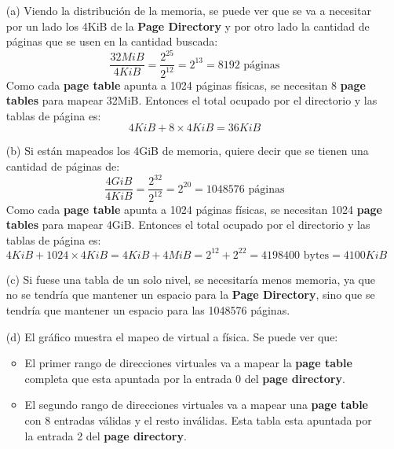 \documentclass[12pt]{article}
\begin{document}
\newpage
\begin{rta}
    \begin{itemize}
        \item[(a)] Viendo la distribución de la memoria, se puede ver que se va a necesitar por un lado los 4KiB de la \textbf{Page Directory} y por otro lado la cantidad de páginas que se usen en la cantidad buscada:
        \begin{equation*}
            \frac{32MiB}{4KiB} = \frac{2^{25}}{2^{12}} = 2^{13} = 8192 \text{ páginas}
        \end{equation*}
        Como cada \textbf{page table} apunta a 1024 páginas físicas, se necesitan 8 \textbf{page tables} para mapear 32MiB. Entonces el total ocupado por el directorio y las tablas de página es:
        \begin{equation*}
            4KiB + 8 \times 4KiB = 36KiB
        \end{equation*}
        \item[(b)] Si están mapeados los 4GiB de memoria, quiere decir que se tienen una cantidad de páginas de:
        \begin{equation*}
            \frac{4GiB}{4KiB} = \frac{2^{32}}{2^{12}} = 2^{20} = 1048576 \text{ páginas}
        \end{equation*}
        Como cada \textbf{page table} apunta a 1024 páginas físicas, se necesitan 1024 \textbf{page tables} para mapear 4GiB. Entonces el total ocupado por el directorio y las tablas de página es:
        \begin{equation*}
            4KiB + 1024 \times 4KiB = 4KiB + 4MiB = 2^{12} + 2^{22} = 4198400 \text{ bytes} = 4100KiB
        \end{equation*}
        \item[(c)] Si fuese una tabla de un solo nivel, se necesitaría menos memoria, ya que no se tendría que mantener un espacio para la \textbf{Page Directory}, sino que se tendría que mantener un espacio para las 1048576 páginas.
        \item[(d)] El gráfico muestra el mapeo de virtual a física. Se puede ver que:
        \begin{itemize}
            \item El primer rango de direcciones virtuales va a mapear la \textbf{page table} completa que esta apuntada por la entrada 0 del \textbf{page directory}.
            \item El segundo rango de direcciones virtuales va a mapear una \textbf{page table} con 8 entradas válidas y el resto inválidas. Esta tabla esta apuntada por la entrada 2 del \textbf{page directory}.
        \end{itemize}
    \end{itemize}
\end{rta}
\end{document}
